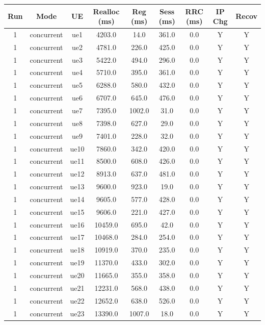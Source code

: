 \begin{table}[ht]
\centering
\begin{tabular}{|c|c|c|c|c|c|c|c|c|}
\hline
Run & Mode & UE & Realloc (ms) & Reg (ms) & Sess (ms) & RRC (ms) & IP Chg & Recov \\
\hline
1 & concurrent & ue1 & 4203.0 & 14.0 & 361.0 & 0.0 & Y & Y \\
1 & concurrent & ue2 & 4781.0 & 226.0 & 425.0 & 0.0 & Y & Y \\
1 & concurrent & ue3 & 5422.0 & 494.0 & 296.0 & 0.0 & Y & Y \\
1 & concurrent & ue4 & 5710.0 & 395.0 & 361.0 & 0.0 & Y & Y \\
1 & concurrent & ue5 & 6288.0 & 580.0 & 432.0 & 0.0 & Y & Y \\
1 & concurrent & ue6 & 6707.0 & 645.0 & 476.0 & 0.0 & Y & Y \\
1 & concurrent & ue7 & 7395.0 & 1002.0 & 31.0 & 0.0 & Y & Y \\
1 & concurrent & ue8 & 7398.0 & 627.0 & 29.0 & 0.0 & Y & Y \\
1 & concurrent & ue9 & 7401.0 & 228.0 & 32.0 & 0.0 & Y & Y \\
1 & concurrent & ue10 & 7860.0 & 342.0 & 420.0 & 0.0 & Y & Y \\
1 & concurrent & ue11 & 8500.0 & 608.0 & 426.0 & 0.0 & Y & Y \\
1 & concurrent & ue12 & 8913.0 & 637.0 & 481.0 & 0.0 & Y & Y \\
1 & concurrent & ue13 & 9600.0 & 923.0 & 19.0 & 0.0 & Y & Y \\
1 & concurrent & ue14 & 9605.0 & 577.0 & 428.0 & 0.0 & Y & Y \\
1 & concurrent & ue15 & 9606.0 & 221.0 & 427.0 & 0.0 & Y & Y \\
1 & concurrent & ue16 & 10459.0 & 695.0 & 42.0 & 0.0 & Y & Y \\
1 & concurrent & ue17 & 10468.0 & 284.0 & 254.0 & 0.0 & Y & Y \\
1 & concurrent & ue18 & 10919.0 & 370.0 & 235.0 & 0.0 & Y & Y \\
1 & concurrent & ue19 & 11370.0 & 433.0 & 302.0 & 0.0 & Y & Y \\
1 & concurrent & ue20 & 11665.0 & 355.0 & 358.0 & 0.0 & Y & Y \\
1 & concurrent & ue21 & 12231.0 & 568.0 & 438.0 & 0.0 & Y & Y \\
1 & concurrent & ue22 & 12652.0 & 638.0 & 526.0 & 0.0 & Y & Y \\
1 & concurrent & ue23 & 13390.0 & 1007.0 & 18.0 & 0.0 & Y & Y \\

\end{tabular}
\end{table}
